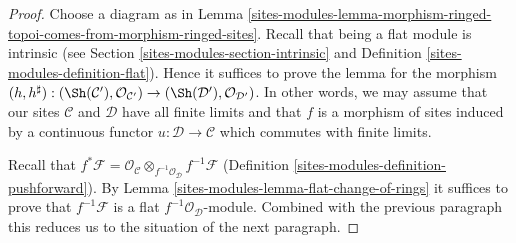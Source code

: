 \begin{proof}
Choose a diagram as in
Lemma \ref{sites-modules-lemma-morphism-ringed-topoi-comes-from-morphism-ringed-sites}.
Recall that being a flat module is intrinsic
(see Section \ref{sites-modules-section-intrinsic} and
Definition \ref{sites-modules-definition-flat}).
Hence it suffices to prove the lemma for
the morphism $(h, h^\sharp) :
(\Sh(\mathcal{C}'), \mathcal{O}_{\mathcal{C}'})
\to
(\Sh(\mathcal{D}'), \mathcal{O}_{\mathcal{D}'})$.
In other words, we may assume that
our sites $\mathcal{C}$ and $\mathcal{D}$
have all finite limits and that $f$ is a morphism
of sites induced by a continuous functor $u : \mathcal{D} \to \mathcal{C}$
which commutes with finite limits.

\medskip\noindent
Recall that $f^*\mathcal{F} =
\mathcal{O}_\mathcal{C} \otimes_{f^{-1}\mathcal{O}_\mathcal{D}}
f^{-1}\mathcal{F}$ (Definition \ref{sites-modules-definition-pushforward}).
By Lemma \ref{sites-modules-lemma-flat-change-of-rings} it suffices to
prove that $f^{-1}\mathcal{F}$ is a flat
$f^{-1}\mathcal{O}_\mathcal{D}$-module. Combined with
the previous paragraph this reduces us to the situation
of the next paragraph.


\end{proof}
